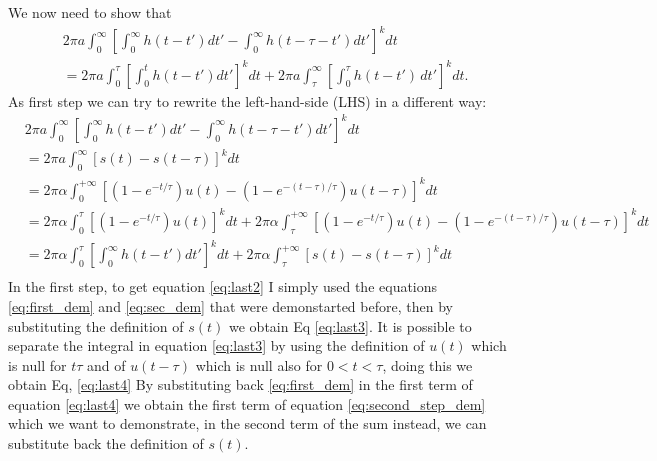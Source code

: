We now need to show that 
\begin{align}\label{eq:second_step_dem}
    &2\pi a \int_{0}^{\infty} \left[ \int_{0}^{\infty} h(t - t') dt' - \int_{0}^{\infty} h(t - \tau - t') dt' \right]^k dt\\ 
    &= 2\pi a \int_{0}^{\tau} \left[ \int_{0}^{t} h(t - t') dt' \right]^k dt + 2\pi a \int_{\tau}^{\infty} \left[ \int_{0}^{\tau} h(t - t') \, dt' \right]^k dt.
\end{align}
%
As first step we can try to rewrite the left-hand-side (LHS) in a different way:
\begin{align}
    & 2\pi a \int_{0}^{\infty} \left[ \int_{0}^{\infty} h(t - t') dt' - \int_{0}^{\infty} h(t - \tau - t') dt' \right]^k dt\\ \label{eq:last1}
    &= 2\pi a \int_{0}^{\infty} \left[s(t) -s(t-\tau)\right]^k dt\\ \label{eq:last2}
    &= 2\pi\alpha \int_0^{+\infty} \left[\left(1 - e^{-t/\tau}\right) u(t) - \left(1 - e^{-(t - \tau)/\tau}\right) u(t - \tau)\right]^k dt\\ \label{eq:last3}
    &= 2\pi\alpha \int_0^{\tau} \left[ \left(1 - e^{-t/\tau}\right)u(t)\right]^k dt + 2\pi\alpha \int_{\tau}^{+\infty} \left[ \left(1 - e^{-t/\tau}\right)u(t) - \left(1 - e^{-(t - \tau)/\tau}\right)u(t-\tau) \right]^k dt\\ \label{eq:last4}
    &=  2\pi\alpha \int_0^{\tau} \left[\int_{0}^{\infty} h(t - t') dt' \right]^k dt + 2\pi\alpha \int_{\tau}^{+\infty} \left[ s(t) - s(t-\tau) \right]^k dt\\ \label{eq:last_step}
\end{align}
%
In the first step, to get equation \ref{eq:last2} I simply used the equations \ref{eq:first_dem} and \ref{eq:sec_dem} that were demonstarted before, then by substituting the definition of $s(t)$ we obtain Eq \ref{eq:last3}.
It is possible to separate the integral in equation \ref{eq:last3} by using the definition of $u(t)$ which is null for $t\tau$ and of $u(t-\tau)$ which is null also for $0<t<\tau$, doing this we obtain Eq, \ref{eq:last4}
By substituting back \ref{eq:first_dem} in the first term of equation \ref{eq:last4} we obtain the first term of equation \ref{eq:second_step_dem} which we want to demonstrate, in the second term of the sum instead, we can substitute back the definition of $s(t)$.

